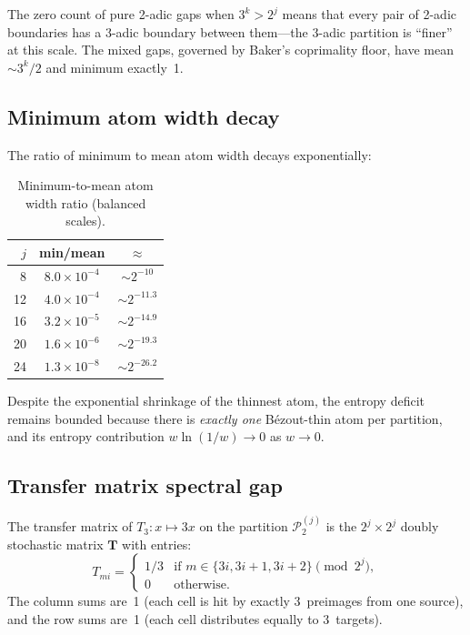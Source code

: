 \documentclass[11pt,a4paper]{article}
\begin{document}
The zero count of pure 2-adic gaps when $3^k > 2^j$ means that
every pair of 2-adic boundaries has a 3-adic boundary between them---the
3-adic partition is ``finer'' at this scale.
The mixed gaps, governed by Baker's coprimality floor, have
mean $\sim 3^k / 2$ and minimum exactly~1.

\subsection{Minimum atom width decay}

The ratio of minimum to mean atom width decays exponentially:

\begin{table}[h]
\centering
\caption{Minimum-to-mean atom width ratio (balanced scales).}
\label{tab:minmean}
\begin{tabular}{rcc}
\toprule
$j$ & min/mean & $\approx$ \\
\midrule
 8 & $8.0 \times 10^{-4}$ & $\sim 2^{-10}$ \\
12 & $4.0 \times 10^{-4}$ & $\sim 2^{-11.3}$ \\
16 & $3.2 \times 10^{-5}$ & $\sim 2^{-14.9}$ \\
20 & $1.6 \times 10^{-6}$ & $\sim 2^{-19.3}$ \\
24 & $1.3 \times 10^{-8}$ & $\sim 2^{-26.2}$ \\
\bottomrule
\end{tabular}
\end{table}

Despite the exponential shrinkage of the thinnest atom, the entropy
deficit remains bounded because there is \emph{exactly one}
B\'ezout-thin atom per partition, and its entropy contribution
$w \ln(1/w) \to 0$ as $w \to 0$.


\subsection{Transfer matrix spectral gap}

The transfer matrix of $T_3\colon x \mapsto 3x$ on the partition
$\mathcal{P}_2^{(j)}$ is the $2^j \times 2^j$ doubly stochastic matrix
$\mathbf{T}$ with entries:
\[
T_{mi} = \begin{cases} 1/3 & \text{if } m \in \{3i, 3i+1, 3i+2\} \pmod{2^j}, \\
0 & \text{otherwise.}
\end{cases}
\]
The column sums are~1 (each cell is hit by exactly 3~preimages from one source),
and the row sums are~1 (each cell distributes equally to 3~targets).
\end{document}
